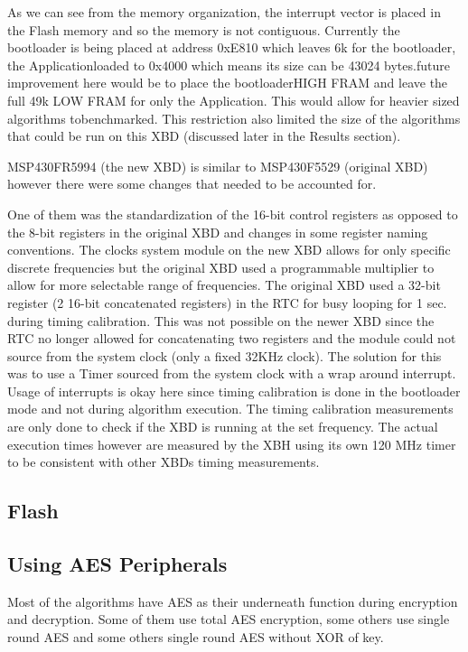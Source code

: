 \documentclass[twoside,11pt]{cergdoc}
\begin{document}
As we can see from the memory organization, the interrupt
vector is placed in the Flash memory and so the memory is not
contiguous. Currently the bootloader is being placed at address
0xE810 which leaves 6k for the bootloader, the Applicationloaded to 0x4000 which means its size can be 43024 bytes.future improvement here would be to place the bootloaderHIGH FRAM and leave the full 49k LOW FRAM for only the
Application. This would allow for heavier sized algorithms tobenchmarked. This restriction also limited the size of the
algorithms that could be run on this XBD (discussed later in the
Results section).

MSP430FR5994 (the new XBD) is similar to MSP430F5529
(original XBD) however there were some changes that needed to
be accounted for.

One of them was the standardization of the 16-bit
control registers as opposed to the 8-bit registers in the
original XBD and changes in some register naming
conventions.
The clocks system module on the new XBD allows for
only specific discrete frequencies but the original XBD
used a programmable multiplier to allow for more
selectable range of frequencies.
The original XBD used a 32-bit register (2 16-bit
concatenated registers) in the RTC for busy looping for
1 sec. during timing calibration. This was not possible
on the newer XBD since the RTC no longer allowed for
concatenating two registers and the module could not
source from the system clock (only a fixed 32KHz
clock). The solution for this was to use a Timer sourced
from the system clock with a wrap around interrupt.
Usage of interrupts is okay here since timing
calibration is done in the bootloader mode and not
during algorithm execution.
The timing calibration measurements are only done to check if
the XBD is running at the set frequency. The actual execution
times however are measured by the XBH using its own 120
MHz timer to be consistent with other XBDs timing
measurements.

    \subsection{Flash}
    \subsection{Using AES Peripherals}
Most of the algorithms have AES as their underneath function
during encryption and decryption. Some of them use total AES
encryption, some others use single round AES and some others
single round AES without XOR of key.
\end{document}
